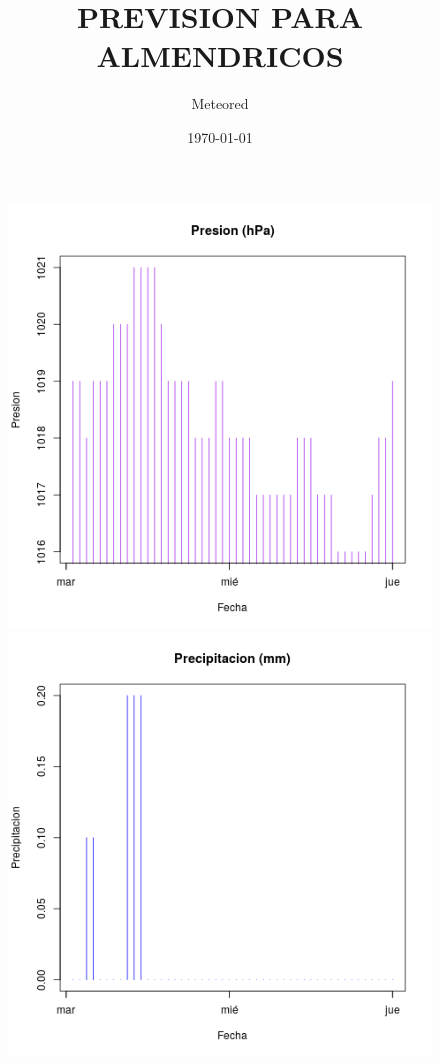 \documentclass{article}
\title{PREVISION PARA ALMENDRICOS}
\date{\today}
\author{Meteored}
\begin{document}
\maketitle %

\begin{figure}[htb]
\begin{center}
   \includegraphics[scale=0.4]{presion.png}
   \includegraphics[scale=0.4]{precipitacion.png}

\end{center}
\end{figure}
\end{document}
